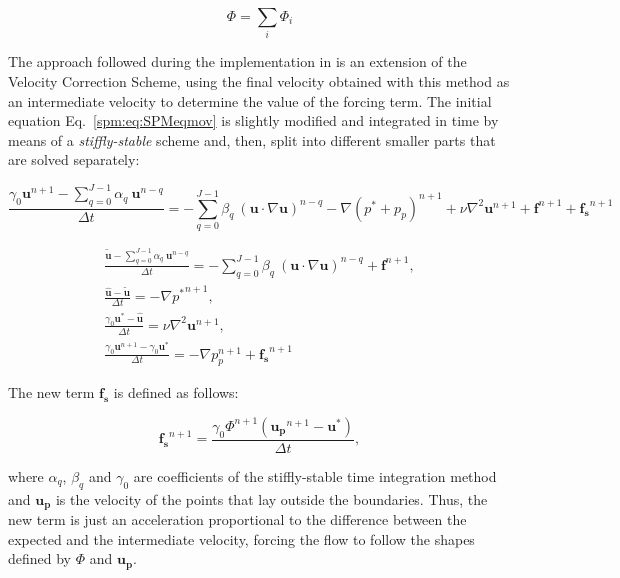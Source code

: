 \begin{equation}
    \Phi = \sum_i \Phi_i
\end{equation}

The approach followed during the implementation in \nekpp is an extension of
the Velocity Correction Scheme, using the final velocity obtained with this
method as an intermediate velocity to determine the value of the forcing term.
The initial equation Eq.~\eqref{spm:eq:SPMeqmov} is slightly modified and
integrated in time by means of a \emph{stiffly-stable} scheme and, then,
split into different smaller parts that are solved separately:

\begin{equation}
     \frac{\gamma_0\mathbf{u}^{n+1}-\sum_{q=0}^{J-1}\alpha_q~\mathbf{u}^{n-q}}
        {\Delta t} = -\sum_{q=0}^{J-1}\beta_q~(\mathbf{u}\cdot
        \nabla\mathbf{u})^{n-q} -\nabla (p^*+p_p)^{n+1} +
        \nu\nabla^2\mathbf{u}^{n+1} + \mathbf{f}^{n+1} + \mathbf{f_s}^{n+1}
\end{equation}

\begin{subequations}
\begin{gather}
    \frac{\mathbf{\tilde{u}}-\sum_{q=0}^{J-1}\alpha_q~\mathbf{u}^{n-q}}
        {\Delta t} = -\sum_{q=0}^{J-1}\beta_q~(\mathbf{u}\cdot
        \nabla\mathbf{u})^{n-q} + \mathbf{f}^{n+1},\\
    \frac{\mathbf{\hat{u}}-\mathbf{\tilde{u}}}{\Delta t} =
        -\nabla {p^*}^{n+1},\\[3mm]
    \frac{\gamma_0\mathbf{u^*}-\mathbf{\hat{u}}}{\Delta t} =
        \nu\nabla^2\mathbf{u}^{n+1},\\[3mm]
    \frac{\gamma_0\mathbf{u}^{n+1}-\gamma_0\mathbf{u^*}}{\Delta t} =
        -\nabla p_p^{n+1} + \mathbf{f_s}^{n+1}
\end{gather}
\end{subequations}

The new term $\mathbf{f_s}$ is defined as follows:

\begin{equation}
    \mathbf{f_s}^{n+1} = \frac{\gamma_0\Phi^{n+1}(\mathbf{u_p}^{n+1}-
        \mathbf{u^*})}{\Delta t},
\end{equation}

where $\alpha_q$, $\beta_q$ and $\gamma_0$ are coefficients of the
stiffly-stable time integration method and $\mathbf{u_p}$ is the velocity of
the points that lay outside the boundaries. Thus, the new term is just an
acceleration proportional to the difference between the expected and the
intermediate velocity, forcing the flow to follow the shapes defined by $\Phi$
and $\mathbf{u_p}$. 

